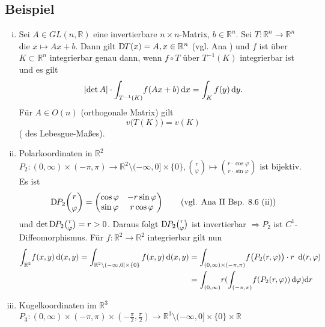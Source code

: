 \subsection[Beispiel: Affine Transformationen und Polarkoordinaten]{Beispiel} %
\label{sub:85}
\begin{enumerate}[(i)]
	\item Sei $A \in GL(n, \mathds{R})$ eine invertierbare $n \times n$-Matrix, $b \in \mathds{R}^n$. Sei $T : \mathds{R}^n \to \mathds{R}^n$ die 
	 $x \mapsto A x+ b$. Dann gilt $\mathrm{D}\mkern-1.5mu T(x) =A, x \in \mathbb{R}^n$ (vgl. Ana ) und $f$ ist über $K \subset \mathds{R}^n$ integrierbar
	genau dann, wenn $f \circ T$ über $T ^{-1} (K)$ integrierbar ist und es gilt
	\[
		\lvert\det A\rvert \cdot  \int_{T ^{-1}(K)}\! f(Ax+b)  \, \mathrm{d}x = \int_K f(y)  \, \mathrm{d}y.
	\]
	Für $A \in O(n)$ (orthogonale Matrix) gilt 
	\[
		v\big( T(K)\big) = v(K)
	\]
	( des Lebesgue-Maßes).
	\item Polarkoordinaten in $\mathds{R}^2$ \\
	$P_2 : (0,\infty) \times (- \pi , \pi) \to \mathds{R}^2 \setminus (- \infty,0] \times \{0\}, \binom{r}{\varphi} \mapsto \binom{r \cdot \cos \varphi}{r \cdot \sin 
	\varphi}$ ist bijektiv. Es ist 
	\[
		\D P_2 \binom{r}{\varphi} = \begin{pmatrix}
			\cos \varphi & -r \sin \varphi \\
			\sin \varphi & r \cos \varphi
		\end{pmatrix} \tag{vgl. Ana \RM{2} Bsp. 8.6 (ii)}
	\]
	und $\det \mathrm{D}\mkern-1.5mu P_2 \binom{r}{\varphi} = r >0$. Daraus folgt $\mathrm{D}\mkern-1.5mu P_2 \binom{r}{\varphi} $ ist invertierbar $\Rightarrow P_2$ ist $C^1$-Diffeomorphismus. Für
	$f : \mathds{R}^2 \to \mathds{R}^2$ integrierbar gilt nun
	\begin{align*}
		\int_{\mathbb{R}^2}\! f(x,y)  \, \mathrm{d}(x,y) = \int_{\mathbb{R}^2 \setminus (- \infty, 0] \times \{0\}} f(x,y)  \, \mathrm{d}(x,y)
		&= \int_{(0, \infty) \times (-\pi , \pi )}\! f\big( P_2(r,\varphi)\big) \cdot r  \enspace \mathrm{d}(r,\varphi) \\ 
		&= \int_{(0,\infty)}\! r ( \int_{(-\pi ,\pi )}\! f(P_2(r,\varphi))  \, \mathrm{d}\varphi)  \mathrm{d}r 
	\end{align*}
	\item Kugelkoordinaten im $\mathds{R}^3$ \\
	$P_3 : (0,\infty) \times (-\pi ,\pi )\times (- \frac{\pi}{2}, \frac{\pi}{2}) \to \mathds{R}^3 \setminus (-\infty, 0] \times \{0\} \times \mathds{R}$

\end{enumerate}
